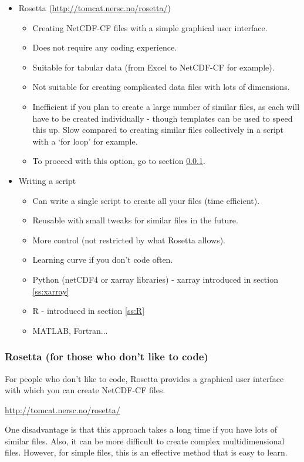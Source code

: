\documentclass[a4paper,english, 11pt]{article}
\begin{document}
\begin{itemize}
\item Rosetta (\url{http://tomcat.nersc.no/rosetta/})
\begin{itemize}
\item Creating NetCDF-CF files with a simple graphical user interface. 
\item Does not require any coding experience.
\item Suitable for tabular data (from Excel to NetCDF-CF for example).
\item Not suitable for creating complicated data files with lots of dimensions.
\item Inefficient if you plan to create a large number of similar files, as each will have to be created individually - though templates can be used to speed this up. Slow compared to creating similar files collectively in a script with a `for loop' for example. 
\item To proceed with this option, go to section \ref{ss:Rosetta}.
\end{itemize}
\item Writing a script
\begin{itemize}
\item Can write a single script to create all your files (time efficient). 
\item Reusable with small tweaks for similar files in the future.
\item More control (not restricted by what Rosetta allows).
\item Learning curve if you don't code often.
\item Python (netCDF4 or xarray libraries) - xarray introduced in section \ref{ss:xarray}
\item R - introduced in section \ref{ss:R}
\item MATLAB, Fortran...   
\end{itemize}
\end{itemize}

\subsubsection{Rosetta (for those who don't like to code)}
\label{ss:Rosetta}

For people who don't like to code, Rosetta provides a graphical user interface with which you can create NetCDF-CF files.

\url{http://tomcat.nersc.no/rosetta/}

One disadvantage is that this approach takes a long time if you have lots of similar files. Also, it can be more difficult to create complex multidimensional files. However, for simple files, this is an effective method that is easy to learn.
\end{document}
